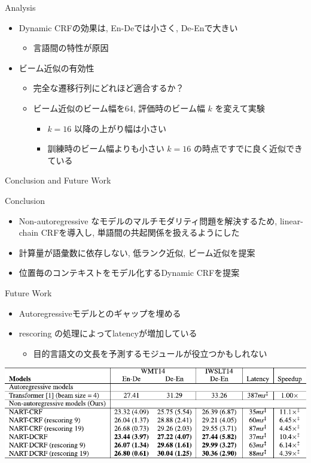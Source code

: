 \documentclass[unicode, 12pt, aspectratio=43]{beamer}
\begin{document}
\begin{frame}[label={sec:org2e78dac}]{Analysis}
\begin{itemize}
\item Dynamic CRFの効果は, En-Deでは小さく, De-Enで大きい
\begin{itemize}
\item 言語間の特性が原因
\end{itemize}
\item ビーム近似の有効性
\begin{itemize}
\item 完全な遷移行列にどれほど適合するか？
\item ビーム近似のビーム幅を64, 評価時のビーム幅 \(k\) を変えて実験
\begin{itemize}
\item \(k = 16\) 以降の上がり幅は小さい
\item 訓練時のビーム幅よりも小さい \(k = 16\) の時点ですでに良く近似できている
\end{itemize}
\end{itemize}
\end{itemize}
\end{frame}

\begin{frame}[label={sec:orgadec039}]{Conclusion and Future Work}
\footnotesize

Conclusion
\begin{itemize}
\item Non-autoregressive なモデルのマルチモダリティ問題を解決するため, linear-chain CRFを導入し, 単語間の共起関係を扱えるようにした
\item 計算量が語彙数に依存しない, 低ランク近似, ビーム近似を提案
\item 位置毎のコンテキストをモデル化するDynamic CRFを提案
\end{itemize}

Future Work
\begin{itemize}
\item Autoregressiveモデルとのギャップを埋める
\item rescoring の処理によってlatencyが増加している
\begin{itemize}
\item 目的言語文の文長を予測するモジュールが役立つかもしれない
\end{itemize}
\end{itemize}
\begin{center}
\includegraphics[width=0.8\linewidth]{./figure/Table2_art_nart.pdf}
\end{center}
\end{frame}
\end{document}
